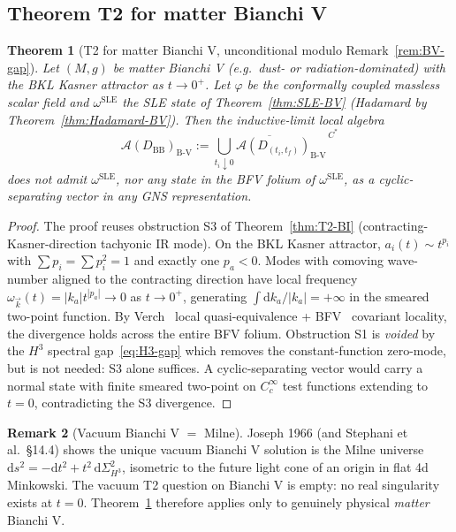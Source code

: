 \documentclass[11pt]{article}
\newtheorem{theorem}{Theorem}
\theoremstyle{definition}
\newtheorem{remark}[theorem]{Remark}
\renewcommand{\AA}{\mathcal{A}}
\newcommand{\BV}{\mathrm{B\text{-}V}}
\newcommand{\BB}{\mathrm{BB}}
\begin{document}
\subsection{Theorem T2 for matter Bianchi V}\label{sec:T2-BV-section}

\begin{theorem}[T2 for matter Bianchi V, unconditional modulo Remark~\ref{rem:BV-gap}]\label{thm:T2BV}
Let $(M,g)$ be matter Bianchi V (e.g.\ dust- or radiation-dominated) with the BKL Kasner attractor as $t\to 0^+$. Let $\varphi$ be the conformally coupled massless scalar field and $\omega^{\mathrm{SLE}}$ the SLE state of Theorem~\ref{thm:SLE-BV} (Hadamard by Theorem~\ref{thm:Hadamard-BV}). Then the inductive-limit local algebra
\begin{equation*}
\AA(D_\BB)_\BV := \overline{\bigcup_{t_i\downarrow 0}\AA(D_{(t_i,t_f)})_\BV}^{\,C^*}
\end{equation*}
does \emph{not} admit $\omega^{\mathrm{SLE}}$, nor any state in the BFV folium of $\omega^{\mathrm{SLE}}$, as a cyclic-separating vector in any GNS representation.
\end{theorem}

\begin{proof}
The proof reuses obstruction S3 of Theorem~\ref{thm:T2-BI} (contracting-Kasner-direction tachyonic IR mode). On the BKL Kasner attractor, $a_i(t)\sim t^{p_i}$ with $\sum p_i=\sum p_i^2=1$ and exactly one $p_a<0$. Modes with comoving wave-number aligned to the contracting direction have local frequency $\omega_{\vec k}(t)=|k_a|t^{|p_a|}\to 0$ as $t\to 0^+$, generating $\int\mathrm{d}k_a/|k_a|=+\infty$ in the smeared two-point function. By Verch~\cite{Verch1994} local quasi-equivalence + BFV~\cite{BrunettiFredenhagenVerch2003} covariant locality, the divergence holds across the entire BFV folium. Obstruction S1 is \emph{voided} by the $H^3$ spectral gap~\eqref{eq:H3-gap} which removes the constant-function zero-mode, but is not needed: S3 alone suffices. A cyclic-separating vector would carry a normal state with finite smeared two-point on $C_c^\infty$ test functions extending to $t=0$, contradicting the S3 divergence.
\end{proof}

\begin{remark}[Vacuum Bianchi V $=$ Milne]\label{rem:vacuumBV}
Joseph 1966 (and Stephani et al.\ \S14.4) shows the unique vacuum Bianchi V solution is the Milne universe $\mathrm{d}s^2 = -\mathrm{d}t^2 + t^2\,\mathrm{d}\Sigma_{H^3}^2$, isometric to the future light cone of an origin in flat 4d Minkowski. The vacuum T2 question on Bianchi V is empty: no real singularity exists at $t=0$. Theorem~\ref{thm:T2BV} therefore applies only to genuinely physical \emph{matter} Bianchi V.
\end{remark}
\end{document}
